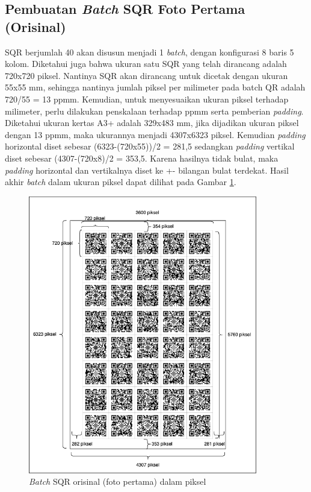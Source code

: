 \subsection{Pembuatan \emph{Batch} SQR Foto Pertama (Orisinal)} SQR berjumlah 40 akan disusun menjadi 1 \emph{batch}, dengan konfigurasi 8 baris 5 kolom. Diketahui juga bahwa ukuran satu SQR
yang telah dirancang adalah 720x720 piksel. Nantinya SQR akan dirancang untuk dicetak dengan ukuran 55x55 mm, sehingga nantinya jumlah piksel per milimeter
pada batch QR adalah 720/55 = 13 ppmm. Kemudian, untuk menyesuaikan ukuran piksel terhadap milimeter, perlu dilakukan penskalaan terhadap ppmm serta pemberian
\emph{padding}. Diketahui ukuran kertas A3+ adalah 329x483 mm, jika dijadikan ukuran piksel dengan 13 ppmm, maka ukurannya menjadi 4307x6323 piksel. Kemudian
\emph{padding} horizontal diset sebesar (6323-(720x55))/2 = 281,5 sedangkan \emph{padding} vertikal diset sebesar (4307-(720x8)/2 = 353,5. Karena hasilnya
tidak bulat, maka \emph{padding} horizontal dan vertikalnya diset ke +- bilangan bulat terdekat. Hasil akhir \emph{batch} dalam ukuran piksel dapat dilihat
pada Gambar \ref{Fig: 3-batchqr}.

\begin{figure}[h]
	\centering
	\includegraphics[width=10cm]{contents/chapter-3/3-batchqr.png}
	\caption{\emph{Batch} SQR orisinal (foto pertama) dalam piksel}
	\label{Fig: 3-batchqr}
\end{figure}

